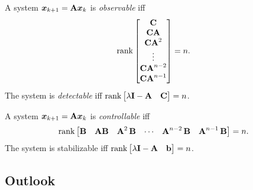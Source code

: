 			\begin{theorem}
				A system \( \bm{x}_{k + 1} = \bm{\mathrm{A}} \bm{x}_k \) is \emph{observable} iff
				\begin{equation}
					\rank
					\begin{bmatrix}
						\bm{\mathrm{C}} \\
						\bm{\mathrm{C}} \bm{\mathrm{A}} \\
						\bm{\mathrm{C}} \bm{\mathrm{A}}^2 \\
						\vdots \\
						\bm{\mathrm{C}} \bm{\mathrm{A}}^{n - 2} \\
						\bm{\mathrm{C}} \bm{\mathrm{A}}^{n - 1}
					\end{bmatrix}
					= n.
				\end{equation}
				The system is \emph{detectable} iff \( \rank \begin{bmatrix} \lambda \bm{\mathrm{I}} - \bm{\mathrm{A}} & \bm{\mathrm{C}} \end{bmatrix} = n \).
			\end{theorem}
			\begin{theorem}
				A system \( \bm{x}_{k + 1} = \bm{\mathrm{A}} \bm{x}_k \) is \emph{controllable} iff
				\begin{equation}
					\rank
					\begin{bmatrix}
						\bm{\mathrm{B}} &
						\bm{\mathrm{A}} \bm{\mathrm{B}} &
						\bm{\mathrm{A}}^2\, \bm{\mathrm{B}} &
						\cdots &
						\bm{\mathrm{A}}^{n - 2}\, \bm{\mathrm{B}} &
						\bm{\mathrm{A}}^{n - 1}\, \bm{\mathrm{B}}
					\end{bmatrix}
					= n.
				\end{equation}
				The system is stabilizable iff \( \rank \begin{bmatrix} \lambda \bm{\mathrm{I}} - \bm{\mathrm{A}} & \bm{\mathrm{b}} \end{bmatrix} = n \).
			\end{theorem}

		\subsection{Outlook} %

